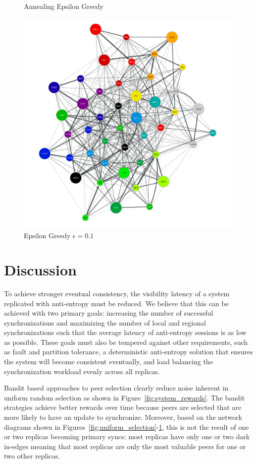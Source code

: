 \begin{figure}[t]
      \caption{Annealing Epsilon Greedy}\label{fig:annealing_epsilon}
    \endminipage\hfill
      \includegraphics[width=\linewidth]{figures/b-epsilon-greedy-0-1-e2}
      \caption{Epsilon Greedy $\epsilon=0.1$}\label{fig:epsilon_greedy_e1}
    \endminipage
\end{figure}

\section{Discussion}

To achieve stronger eventual consistency, the visibility latency
of a system replicated with anti-entropy must be reduced.
We believe that this can be achieved with two primary goals: increasing
the number of successful synchronizations and maximizing the number
of local and regional synchronizations such that the average latency of
anti-entropy sessions is as low as possible.
These goals must also be tempered against other requirements, such as
fault and partition tolerance, a deterministic anti-entropy solution that
ensures the system will become consistent eventually, and load balancing
the synchronization workload evenly across all replicas.

Bandit based approaches to peer selection clearly reduce noise inherent
in uniform random selection as shown in Figure~\ref{fig:system_rewards}.
The bandit strategies achieve better rewards over time because peers
are selected that are more likely to have an update to synchronize.
Moreover, based on the network diagrams shown in
Figures~\ref{fig:uniform_selection}-\ref{fig:epsilon_greedy_e1}, this is
not the result of one or two replicas becoming primary syncs: most
replicas have only one or two dark in-edges meaning that most replicas
are only the most valuable peers for one or two other replicas.


